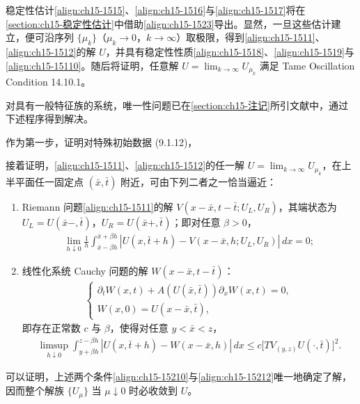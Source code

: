 \documentclass[../../main.tex]{subfiles}
\begin{document}
稳定性估计\eqref{align:ch15-1515}、\eqref{align:ch15-1516}与\eqref{align:ch15-1517}将在\cref{section:ch15-稳定性估计}中借助\eqref{align:ch15-1523}导出。显然，一旦这些估计建立，便可沿序列 $\{\mu_k\}$（$\mu_k\to0$，$k\to\infty$）取极限，得到\eqref{align:ch15-1511}、\eqref{align:ch15-1512}的解 $U$，并具有稳定性性质\eqref{align:ch15-1518}、\eqref{align:ch15-1519}与\eqref{align:ch15-15110}。随后将证明，任意解 $U=\lim_{k\to\infty}U_{\mu_k}$ 满足 Tame Oscillation Condition 14.10.1。

对具有一般特征族的系统，唯一性问题已在\cref{section:ch15-注记}所引文献中，通过下述程序得到解决。

作为第一步，证明对特殊初始数据 (9.1.12)，

接着证明，\eqref{align:ch15-1511}、\eqref{align:ch15-1512}的任一解 $U=\lim_{k\to\infty}U_{\mu_k}$，在上半平面任一固定点 $(\bar x,\bar t)$ 附近，可由下列二者之一恰当逼近：
\begin{enumerate}
\item\label{item:ch15-152-r-a} Riemann 问题\eqref{align:ch15-1511}的解 $V(x-\bar x,t-\bar t;U_L,U_R)$，其端状态为 $U_L=U(\bar x-,\bar t)$，$U_R=U(\bar x+,\bar t)$；即对任意 $\beta>0$，
\begin{align}
\lim_{h\downarrow0}\frac1h\int_{\bar x-\beta h}^{\bar x+\beta h}|U(x,\bar t+h)-V(x-\bar x,h;U_L,U_R)|\,dx=0;
\label{align:ch15-15210}
\end{align}
\item\label{item:ch15-152-r-b} 线性化系统 Cauchy 问题的解 $W(x-\bar x,t-\bar t)$：
\begin{align}
\begin{cases}
\partial_tW(x,t)+A(U(\bar x,\bar t))\partial_xW(x,t)=0,\\
W(x,0)=U(x-\bar x,\bar t),
\end{cases}
\label{align:ch15-15211}
\end{align}
即存在正常数 $c$ 与 $\beta$，使得对任意 $y<\bar x<z$，
\begin{align}
\limsup_{h\downarrow0}\int_{y+\beta h}^{z-\beta h}|U(x,\bar t+h)-W(x-\bar x,h)|\,dx\leqslant c\bigl[TV_{(y,z)}U(\cdot,\bar t)\bigr]^2.
\label{align:ch15-15212}
\end{align}
\end{enumerate}

可以证明，上述两个条件\eqref{align:ch15-15210}与\eqref{align:ch15-15212}唯一地确定了解，因而整个解族 $\{U_\mu\}$ 当 $\mu\downarrow0$ 时必收敛到 $U$。
\end{document}
